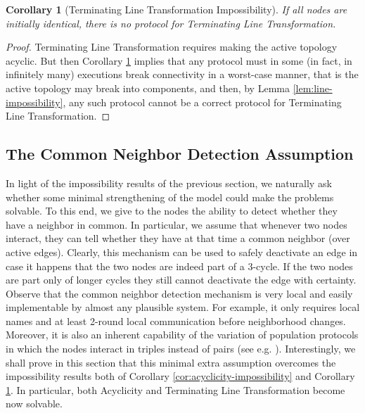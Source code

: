 \documentclass[preprint]{elsarticle}
\newtheorem{corollary}{Corollary}
\begin{document}
\begin{corollary} [Terminating Line Transformation Impossibility] \label{cor:line-impossibility}
If all nodes are initially identical, there is no protocol for Terminating Line Transformation.
\end{corollary}
\begin{proof}
Terminating Line Transformation requires making the active topology acyclic. But then Corollary \ref{cor:line-impossibility} implies that any protocol must in some (in fact, in infinitely many) executions break connectivity in a worst-case manner, that is the active topology may break into  components, and then, by Lemma \ref{lem:line-impossibility}, any such protocol cannot be a correct protocol for Terminating Line Transformation.
\end{proof}

\subsection{The Common Neighbor Detection Assumption}
\label{subsec:neighbor-detection}

In light of the impossibility results of the previous section, we naturally ask whether some minimal strengthening of the model could make the problems solvable. To this end, we give to the nodes the ability to detect whether they have a neighbor in common. In particular, we assume that whenever two nodes interact, they can tell whether they have at that time a common neighbor (over active edges).
Clearly, this mechanism can be used to safely deactivate an edge in case it happens
that the two nodes are indeed part of a 3-cycle. If the two nodes are part
only of longer cycles they still cannot deactivate the edge with
certainty. Observe that the common neighbor detection mechanism is very local and easily implementable by almost any plausible system. For example, it only requires local names and at least 2-round local communication before neighborhood changes. Moreover, it is also an inherent capability of the
variation of population protocols in which the nodes interact in triples instead of pairs (see e.g. \cite{AADFP06,BBRR12}). Interestingly, we shall prove in this section that this minimal extra assumption overcomes the impossibility results both of Corollary \ref{cor:acyclicity-impossibility} and Corollary \ref{cor:line-impossibility}. In particular, both Acyclicity and Terminating Line Transformation become now solvable.
\end{document}
